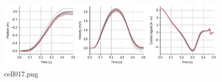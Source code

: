 \begin{figure}[ht]
	\centering
	\includegraphics[scale=0.8, max width=\linewidth]{./fig/motor-learning/optimal-feedback-control/cell017.png}
	\caption{cell017.png}
	\label{cell017.png}
\end{figure}